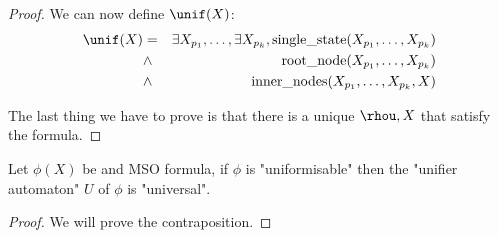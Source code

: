 \documentclass{article}
\begin{document}
\begin{proof}
	We can now define $\unif(X)$:
	\begin{eqnarray*}
		\unif (X) &=& \exists X_{p_1}, \ldots, \exists X_{p_k}, \text{single\_state} (X_{p_1}, \ldots, X_{p_k}) \\
		&\land& \text{root\_node} (X_{p_1}, \ldots, X_{p_k})\\
		&\land& \text{inner\_nodes} (X_{p_1}, \ldots, X_{p_k}, X)
	\end{eqnarray*}

	\item The last thing we have to prove is that there is a unique $\rhou, X$ that satisfy the formula.
	\todo{~}
\end{proof}


\begin{lemma}
	Let $\phi(X)$ be and MSO formula, if $\phi$ is "uniformisable" then the "unifier automaton" $U$ of $\phi$ is "universal".
\end{lemma}

\begin{proof}
	We will prove the contraposition.
	\todo{~}
\end{proof}



\iffalse
	
	
\fi
\end{document}

